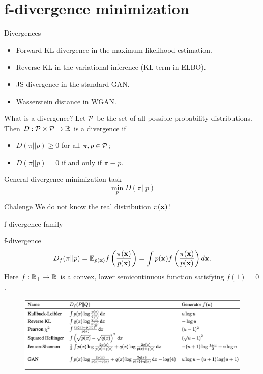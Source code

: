 \documentclass{beamer}
\begin{document}
\section{f-divergence minimization}
\begin{frame}{Divergences}
	\begin{itemize}
		\item Forward KL divergence in the maximum likelihood estimation.
		\item Reverse KL in the variational inference (KL term in ELBO).
		\item JS divergence in the standard GAN.
		\item Wasserstein distance in WGAN.
	\end{itemize}
	\begin{block}{What is a divergence?}
		Let $\mathcal{P}$ be the set of all possible probability distributions. Then $D: \mathcal{P} \times \mathcal{P} \rightarrow \mathbb{R}$ is a divergence if 
		\begin{itemize}
			\item $D(\pi || p) \geq 0$ for all $\pi, p \in \mathcal{P}$;
			\item $D(\pi || p) = 0$ if and only if $\pi \equiv p$.
		\end{itemize}
	\end{block}
	\begin{block}{General divergence minimization task}
		\vspace{-0.3cm}
		\[
			\min_p D(\pi || p)
		\]
		\vspace{-0.7cm}
	\end{block}
	\begin{block}{Chalenge}
		We do not know the real distribution $\pi(\mathbf{x})$!
	\end{block}
\end{frame}
\begin{frame}{f-divergence family}
	
	\begin{block}{f-divergence}
		\vspace{-0.3cm}
		\[
		D_f(\pi || p) = \mathbb{E}_{p(\mathbf{x})}  f\left( \frac{\pi(\mathbf{x})}{p(\mathbf{x})} \right)  = \int p(\mathbf{x}) f\left( \frac{\pi(\mathbf{x})}{p(\mathbf{x})} \right) d \mathbf{x}.
		\]
		Here $f: \mathbb{R}_+ \rightarrow \mathbb{R}$ is a convex, lower semicontinuous function satisfying $f(1) = 0$.
	\end{block}
	\begin{figure}
		\centering
		\includegraphics[width=\linewidth]{figs/f_divs}
	\end{figure}
\end{frame}
\end{document}
